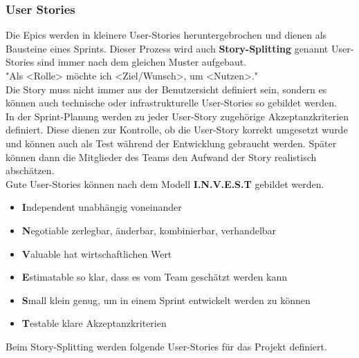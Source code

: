 \documentclass[a4paper, table]{article}
\begin{document}
\subsubsection{User Stories}\label{user-stories}
Die Epics werden in kleinere User-Stories heruntergebrochen und dienen als Bausteine eines Sprints.
Dieser Prozess wird auch \textbf{Story-Splitting} genannt
User-Stories sind immer nach dem gleichen Muster aufgebaut. \\
"Als <Rolle> möchte ich <Ziel/Wunsch>, um <Nutzen>." \\
Die Story muss nicht immer aus der Benutzersicht definiert sein, sondern es können auch technische oder infrastrukturelle User-Stories so gebildet werden.\\
In der Sprint-Planung werden zu jeder User-Story zugehörige Akzeptanzkriterien definiert. 
Diese dienen zur Kontrolle, ob die User-Story korrekt umgesetzt wurde und können auch als Test während der Entwicklung gebraucht werden. 
Später können dann die Mitglieder des Teams den Aufwand der Story realistisch abschätzen.\\
Gute User-Stories können nach dem Modell \textbf{I.N.V.E.S.T} gebildet werden. \autocite{hammerschall_software_2013} %
\begin{itemize}
    \item \textbf{I}ndependent  unabhängig voneinander
    \item \textbf{N}egotiable   zerlegbar, änderbar, kombinierbar, verhandelbar
    \item \textbf{V}aluable     hat wirtschaftlichen Wert
    \item \textbf{E}stimatable  so klar, dass es vom Team geschätzt werden kann
    \item \textbf{S}mall        klein genug, um in einem Sprint entwickelt werden zu können
    \item \textbf{T}estable     klare Akzeptanzkriterien
\end{itemize}
Beim Story-Splitting werden folgende User-Stories für das Projekt definiert.
\end{document}
